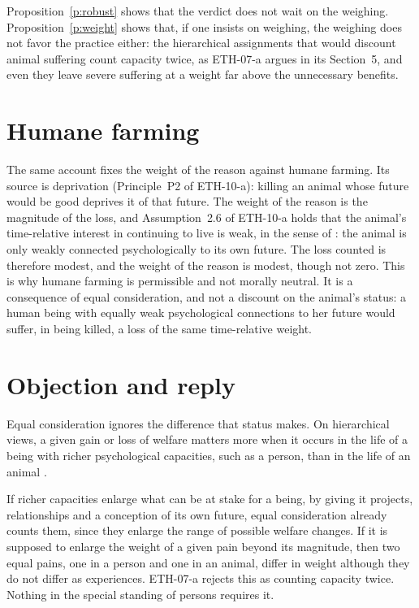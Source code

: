 \documentclass{situationist-preprint}
\begin{document}
Proposition~\ref{p:robust} shows that the verdict does not wait on the weighing. Proposition~\ref{p:weight} shows that, if one insists on weighing, the weighing does not favor the practice either: the hierarchical assignments that would discount animal suffering count capacity twice, as ETH-07-a argues in its Section~5, and even they leave severe suffering at a weight far above the unnecessary benefits.

\section{Humane farming}

The same account fixes the weight of the reason against humane farming. Its source is deprivation (Principle~P2 of ETH-10-a): killing an animal whose future would be good deprives it of that future. The weight of the reason is the magnitude of the loss, and Assumption~2.6 of ETH-10-a holds that the animal's time-relative interest in continuing to live is weak, in the sense of \citet{McMahan2002}: the animal is only weakly connected psychologically to its own future. The loss counted is therefore modest, and the weight of the reason is modest, though not zero. This is why humane farming is permissible and not morally neutral. It is a consequence of equal consideration, and not a discount on the animal's status: a human being with equally weak psychological connections to her future would suffer, in being killed, a loss of the same time-relative weight.

\section{Objection and reply}

\begin{objection}
Equal consideration ignores the difference that status makes. On hierarchical views, a given gain or loss of welfare matters more when it occurs in the life of a being with richer psychological capacities, such as a person, than in the life of an animal \citep{Kagan2019}.
\end{objection}

\begin{reply}
If richer capacities enlarge what can be at stake for a being, by giving it projects, relationships and a conception of its own future, equal consideration already counts them, since they enlarge the range of possible welfare changes. If it is supposed to enlarge the weight of a given pain beyond its magnitude, then two equal pains, one in a person and one in an animal, differ in weight although they do not differ as experiences. ETH-07-a rejects this as counting capacity twice. Nothing in the special standing of persons requires it.
\end{reply}
\end{document}
